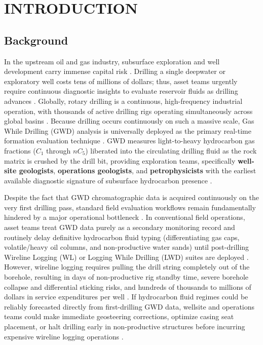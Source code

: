 \chapter{INTRODUCTION}

\section{Background}

In the upstream oil and gas industry, subsurface exploration and well development carry immense capital risk \citep{ref3, ref9}. Drilling a single deepwater or exploratory well costs tens of millions of dollars; thus, asset teams urgently require continuous diagnostic insights to evaluate reservoir fluids as drilling advances \citep{ref3}. Globally, rotary drilling is a continuous, high-frequency industrial operation, with thousands of active drilling rigs operating simultaneously across global basins \citep{ref9, ref14, bakerhughes2024}. Because drilling occurs continuously on such a massive scale, Gas While Drilling (GWD) analysis is universally deployed as the primary real-time formation evaluation technique \citep{ref9, ref12}. GWD measures light-to-heavy hydrocarbon gas fractions ($C_1$ through $nC_5$) liberated into the circulating drilling fluid as the rock matrix is crushed by the drill bit, providing exploration teams, specifically \textbf{well-site geologists}, \textbf{operations geologists}, and \textbf{petrophysicists} with the earliest available diagnostic signature of subsurface hydrocarbon presence \citep{ref12, haworth1985}.

Despite the fact that GWD chromatographic data is acquired continuously on the very first drilling pass, standard field evaluation workflows remain fundamentally hindered by a major operational bottleneck \citep{ref9, ref11}. In conventional field operations, asset teams treat GWD data purely as a secondary monitoring record and routinely delay definitive hydrocarbon fluid typing (differentiating gas caps, volatile/heavy oil columns, and non-productive water sands) until post-drilling Wireline Logging (WL) or Logging While Drilling (LWD) suites are deployed \citep{ref8, ref12}. However, wireline logging requires pulling the drill string completely out of the borehole, resulting in days of non-productive rig standby time, severe borehole collapse and differential sticking risks, and hundreds of thousands to millions of dollars in service expenditures per well \citep{ref3, ref9}. If hydrocarbon fluid regimes could be reliably forecasted directly from first-drilling GWD data, wellsite and operations teams could make immediate geosteering corrections, optimize casing seat placement, or halt drilling early in non-productive structures before incurring expensive wireline logging operations \citep{ref3, ref8}.

